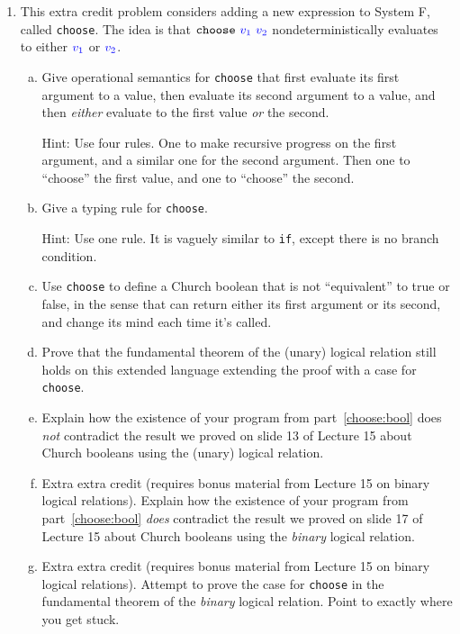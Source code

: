 \documentclass{article}
\theoremstyle{definition}
\newcommand{\meta}[1]{{\color{blue}#1}}
\begin{document}
\begin{enumerate}[resume*]
\item This extra credit problem considers adding a new expression to System F, called \texttt{choose}.
  The idea is that $\mathtt{choose}\ \meta{v_1}\ \meta{v_2}$ nondeterministically evaluates to
  either $\meta{v_1}$ or $\meta{v_2}$.
  \begin{enumerate}[(a),left=1em]
  \item Give operational semantics for \texttt{choose} that first evaluate its
    first argument to a value, then evaluate its second argument to a value, and
    then \emph{either} evaluate to the first value \emph{or} the second.

    Hint: Use four rules. One to make recursive progress on the first argument,
    and a similar one for the second argument. Then one to ``choose'' the first
    value, and one to ``choose'' the second.
  \item Give a typing rule for \texttt{choose}.

    Hint: Use one rule. It is vaguely similar to \texttt{if}, except there is no
    branch condition.
  \item\label{choose:bool} Use \texttt{choose} to define a Church boolean that is not ``equivalent'' to true or false,
    in the sense that can return either its first argument or its second, and change its mind each time it's called.
  \item Prove that the fundamental theorem of the (unary) logical relation still holds
    on this extended language extending the proof with a case for \texttt{choose}.
  \item Explain how the existence of your program from part~\ref{choose:bool}
    does \emph{not} contradict the result we proved on slide 13 of Lecture 15 about
    Church booleans using the (unary) logical relation.
  \item Extra extra credit (requires bonus material from Lecture 15 on binary logical relations).
    Explain how the existence of your program from part~\ref{choose:bool}
    \emph{does} contradict the result we proved on slide 17 of Lecture 15 about
    Church booleans using the \emph{binary} logical relation.
  \item Extra extra credit (requires bonus material from Lecture 15 on binary logical
    relations).  Attempt to prove the case for \texttt{choose} in the
    fundamental theorem of the \emph{binary} logical relation. Point to exactly
    where you get stuck.
  \end{enumerate}
\end{enumerate}
\end{document}
